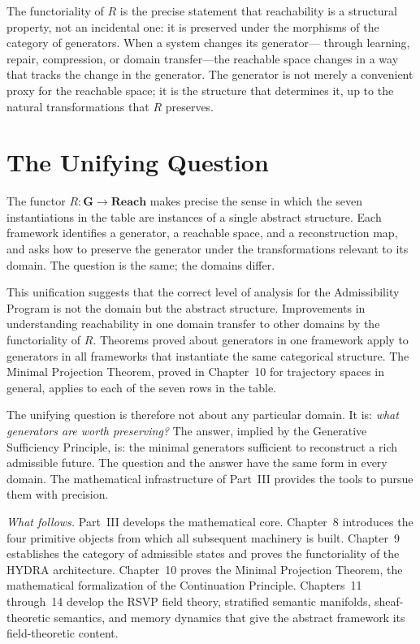 \documentclass[12pt, oneside]{book}
\theoremstyle{flyxion}
\theoremstyle{definition}
\begin{document}
The functoriality of $R$ is the precise statement that
reachability is a structural property, not an incidental
one: it is preserved under the morphisms of the category
of generators. When a system changes its generator---
through learning, repair, compression, or domain
transfer---the reachable space changes in a way that
tracks the change in the generator. The generator is
not merely a convenient proxy for the reachable space;
it is the structure that determines it, up to the
natural transformations that $R$ preserves.

\section{The Unifying Question}

The functor $R : \mathbf{G} \to \mathbf{Reach}$ makes
precise the sense in which the seven instantiations in
the table are instances of a single abstract structure.
Each framework identifies a generator, a reachable space,
and a reconstruction map, and asks how to preserve the
generator under the transformations relevant to its
domain. The question is the same; the domains differ.

This unification suggests that the correct level of
analysis for the Admissibility Program is not the
domain but the abstract structure. Improvements in
understanding reachability in one domain transfer to
other domains by the functoriality of $R$. Theorems
proved about generators in one framework apply to
generators in all frameworks that instantiate the
same categorical structure. The Minimal Projection
Theorem, proved in Chapter~10 for trajectory spaces
in general, applies to each of the seven rows in the
table.

The unifying question is therefore not about any
particular domain. It is: \emph{what generators are
worth preserving?} The answer, implied by the
Generative Sufficiency Principle, is: the minimal
generators sufficient to reconstruct a rich admissible
future. The question and the answer have the same form
in every domain. The mathematical infrastructure of
Part~III provides the tools to pursue them with precision.

\bigskip
\noindent\emph{What follows.} Part~III develops the
mathematical core. Chapter~8 introduces the four
primitive objects from which all subsequent machinery
is built. Chapter~9 establishes the category of
admissible states and proves the functoriality of the
HYDRA architecture. Chapter~10 proves the Minimal
Projection Theorem, the mathematical formalization of
the Continuation Principle. Chapters~11 through~14
develop the RSVP field theory, stratified semantic
manifolds, sheaf-theoretic semantics, and memory
dynamics that give the abstract framework its
field-theoretic content.
\end{document}

